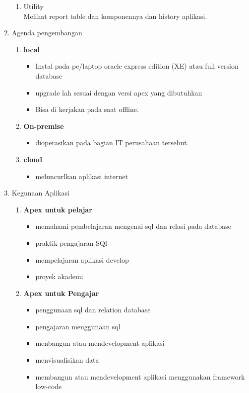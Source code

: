 \begin{enumerate}
\begin{enumerate}
\item Utility
\\ Melihat report table dan komponennya dan history aplikasi.
\end{enumerate}
\item Agenda pengembangan 
\begin{enumerate}
\item \textbf{local}
\begin{itemize}
\item Instal pada pc/laptop oracle express edition (XE) atau full version database
\item upgrade lah sesuai dengan  versi apex yang dibutuhkan 
\item Bisa di kerjakan pada saat offline.
\end{itemize}

\item \textbf{On-premise}
\begin{itemize}
\item dioperasikan pada bagian IT perusahaan tersebut.
\end{itemize}

\item \textbf{cloud}
\begin{itemize}
\item meluncurlkan aplikasi internet
\end{itemize}
\end{enumerate}

\item Kegunaan Aplikasi
\begin{enumerate}
\item \textbf{Apex untuk pelajar}
\begin{itemize}
\item memahami pembelajaran mengenai sql dan relasi pada database
\item praktik pengajaran SQl
\item mempelajaran aplikasi develop
\item proyek akademi
\end{itemize}

\item \textbf{Apex untuk Pengajar}
\begin{itemize}
\item penggunaan sql dan relation database
\item pengajaran menggunaan sql
\item menbangun atau mendevelopment aplikasi 
\item menvisualisikan data
\item membangun atau mendevelopment aplikasi menggunakan framework low-code
\end{itemize}
\end{enumerate}




\end{enumerate}
